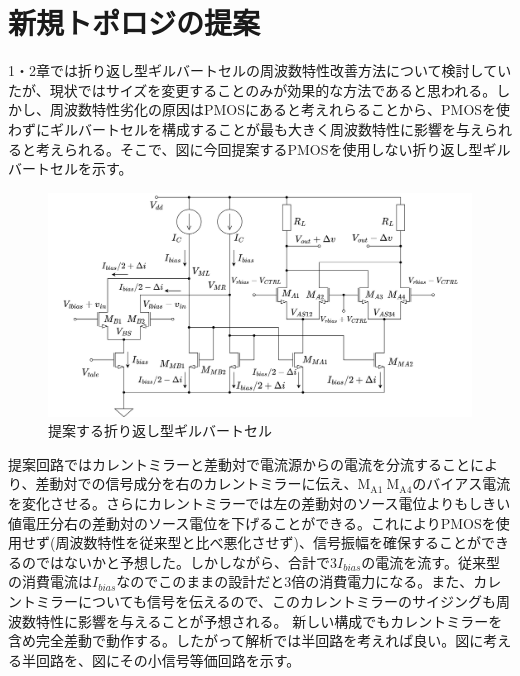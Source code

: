 \documentclass[twocolumn]{jsarticle}
\begin{document}
\section{新規トポロジの提案}
    1・2章では折り返し型ギルバートセルの周波数特性改善方法について検討していたが、現状ではサイズを変更することのみが効果的な方法であると思われる。しかし、周波数特性劣化の原因はPMOSにあると考えれらることから、PMOSを使わずにギルバートセルを構成することが最も大きく周波数特性に影響を与えられると考えられる。そこで、図に今回提案するPMOSを使用しない折り返し型ギルバートセルを示す。
    \begin{figure}[t]
        \begin{center}
            \includegraphics*[width = 160mm]{figures/NtoNFolded.png}
            \caption{提案する折り返し型ギルバートセル}
            \label{fig:NtoN_folded}
        \end{center}
    \end{figure}
    提案回路ではカレントミラーと差動対で電流源からの電流を分流することにより、差動対での信号成分を右のカレントミラーに伝え、$\mathrm{M_{A1}~M_{A4}}$のバイアス電流を変化させる。さらにカレントミラーでは左の差動対のソース電位よりもしきい値電圧分右の差動対のソース電位を下げることができる。これによりPMOSを使用せず(周波数特性を従来型と比べ悪化させず)、信号振幅を確保することができるのではないかと予想した。しかしながら、合計で$3I_{bias}$の電流を流す。従来型の消費電流は$I_{bias}$なのでこのままの設計だと3倍の消費電力になる。また、カレントミラーについても信号を伝えるので、このカレントミラーのサイジングも周波数特性に影響を与えることが予想される。
    新しい構成でもカレントミラーを含め完全差動で動作する。したがって解析では半回路を考えれば良い。図に考える半回路を、図にその小信号等価回路を示す。
\end{document}
